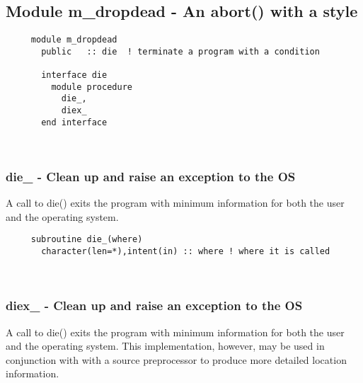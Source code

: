   \subsection{Module m\_dropdead - An abort() with a style }

\begin{verbatim} 
     module m_dropdead
       public	:: die	! terminate a program with a condition
 
       interface die
         module procedure
           die_,	
           diex_
       end interface
 \end{verbatim}%
 
 
\mbox{}\hrulefill\ 
 
\subsubsection{die\_ - Clean up and raise an exception to the OS}

     A call to die() exits the program with minimum information for
     both the user and the operating system.
  
\begin{verbatim} 
     subroutine die_(where)
       character(len=*),intent(in) :: where	! where it is called
 \end{verbatim}%
 
 
\mbox{}\hrulefill\ 
 
  \subsubsection{diex\_ - Clean up and raise an exception to the OS}

     A call to die() exits the program with minimum information for
     both the user and the operating system.  This implementation,
     however, may be used in conjunction with with a source preprocessor
     to produce more detailed location information.
  
